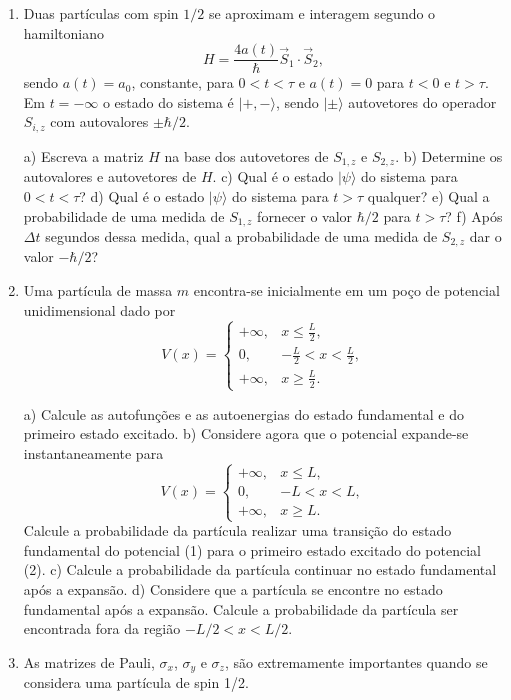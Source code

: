 \begin{enumerate}[start=1,label={\bfseries Q\arabic*.}]
\item Duas partículas com spin $1/2$ se aproximam e interagem segundo o hamiltoniano
$$
H = \frac{4a(t)}{\hbar} \vec{S}_{1} \cdot \vec{S}_{2},
$$
sendo $a(t) = a_{0}$, constante, para $0 < t < \tau$ e $a(t) = 0$ para $t < 0$ e $t > \tau$. Em $t = - \infty$ o estado do sistema é $|+, - \rangle$, sendo $|\pm \rangle$ autovetores do operador $S_{i,z}$ com autovalores $\pm \hbar / 2$.

a) Escreva a matriz $H$ na base dos autovetores de $S_{1,z}$ e $S_{2,z}$.
b) Determine os autovalores e autovetores de $H$.
c) Qual é o estado $|\psi \rangle$ do sistema para $0 < t < \tau$?
d) Qual é o estado $|\psi \rangle$ do sistema para $t > \tau$ qualquer?
e) Qual a probabilidade de uma medida de $S_{1,z}$ fornecer o valor $\hbar/2$ para $t > \tau$?
f) Após $\Delta t$ segundos dessa medida, qual a probabilidade de uma medida de $S_{2,z}$ dar o valor $-\hbar/2$?



\item Uma partícula de massa $m$ encontra-se inicialmente em um poço de potencial unidimensional dado por
$$
V(x)=\left\{\begin{array}{cc}
+\infty, &  x \leq \frac{L}{2}, \\
0, &  -\frac{L}{2} <x<  \frac{L}{2},\\
+\infty, &  x \geq \frac{L}{2}.
\end{array}\right.
$$

a) Calcule as autofunções e as autoenergias do estado fundamental e do primeiro estado excitado.
b) Considere agora que o potencial expande-se instantaneamente para
$$
V(x)=\left\{\begin{array}{cc}
+\infty, &  x \leq L, \\
0, &  -L <x<  L,\\
+\infty, &  x \geq L.
\end{array}\right.
$$
Calcule a probabilidade da partícula realizar uma transição do estado fundamental do potencial (1) para o primeiro estado excitado do potencial (2).
c) Calcule a probabilidade da partícula continuar no estado fundamental após a expansão.
d) Considere que a partícula se encontre no estado fundamental após a expansão. Calcule a probabilidade da partícula ser encontrada fora da região $-L/2 < x < L/2$.




\item As matrizes de Pauli, $\sigma_{x}$, $\sigma_{y}$ e $\sigma_{z}$, são extremamente importantes quando se considera uma partícula de spin 1/2.


\end{enumerate}
